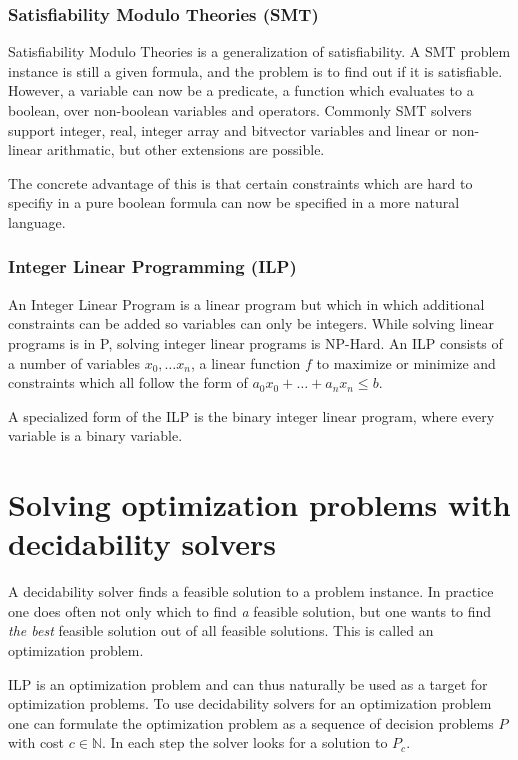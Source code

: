 \documentclass{sig-alternate}
\begin{document}
\subsubsection*{Satisfiability Modulo Theories (SMT)}

Satisfiability Modulo Theories is a generalization of satisfiability.
A SMT problem instance is still a given formula, and the problem is to find out if it is satisfiable.
However, a variable can now be a predicate, a function which evaluates to a boolean, over non-boolean variables and operators.
Commonly SMT solvers support integer, real, integer array and bitvector variables and linear or non-linear arithmatic, but other extensions are possible.

The concrete advantage of this is that certain constraints which are hard to specifiy in a pure boolean formula can now be specified in a more natural language.

\subsubsection*{Integer Linear Programming (ILP)}

An Integer Linear Program is a linear program but which in which additional constraints can be added so variables can only be integers.
While solving linear programs is in P, solving integer linear programs is NP-Hard.
An ILP consists of a number of variables $x_0, \ldots x_n$, a linear function $f$ to maximize or minimize and constraints which all follow the form of $a_0 x_0 + \ldots + a_n x_n \leq b$.

A specialized form of the ILP is the binary integer linear program, where every variable is a binary variable.

\newpage

\section{Solving optimization problems with decidability solvers}
\label{sec:OptWithDec}

A decidability solver finds a feasible solution to a problem instance.
In practice one does often not only which to find \emph{a} feasible solution, but one wants to find \emph{the best} feasible solution out of all feasible solutions.
This is called an optimization problem.

ILP is an optimization problem and can thus naturally be used as a target for optimization problems.
To use decidability solvers for an optimization problem one can formulate the optimization problem as a sequence of decision problems $P$ with cost $c \in \mathbb{N}$.
In each step the solver looks for a solution to $P_c$.
\end{document}
